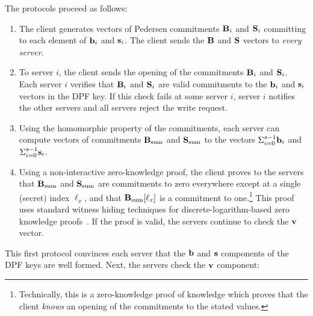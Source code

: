 \documentclass[10pt,twocolumn]{article}
\begin{document}
The protocols proceed as follows:

\begin{enumerate}
  \item The client generates vectors of Pedersen commitments ${\bf B}_i$
    and ${\bf S}_i$ committing to each element of ${\bf b}_i$ and ${\bf s}_i$.
    The client sends the ${\bf B}$ and ${\bf S}$ vectors to {\em every server}.
  \item To server $i$, the client sends the opening of the commitments
    ${\bf B}_i$ and ${\bf S}_i$.
    Each server $i$ verifies that ${\bf B}_i$ and ${\bf S}_i$ are valid
    commitments to the ${\bf b}_i$ and ${\bf s}_i$ vectors in the DPF key.
    If this check fails at some server $i$, server $i$
    notifies the other servers and all servers reject the write request.
  \item \label{item:check-commit}
    Using the homomorphic property of the commitments, each server can compute
    vectors of commitments ${\bf B}_\textrm{sum}$ and ${\bf S}_\textrm{sum}$
    to the vectors $\Sigma_{i=0}^{s-1} {\bf b}_i$ and $\Sigma_{i=0}^{s-1} {\bf s}_i$.
  \item \label{item:check-proof}
    Using a non-interactive zero-knowledge proof, the client proves to 
    the servers that ${\bf B}_\textrm{sum}$ and ${\bf S}_\textrm{sum}$
    are commitments to zero everywhere except at a single (secret) index $\ell_x$,
    and that ${\bf B}_\textrm{sum}[\ell_x]$ is a commitment to one.\footnote{
Technically, this is a zero-knowledge proof of knowledge
which proves that the client {\em knows} an opening of
the commitments to the stated values.
}
    This proof uses standard witness hiding techniques
    for discrete-logarithm-based zero knowledge 
    proofs~\cite{camenisch1997proof,cramer1994proofs}.
    If the proof is valid, the servers continue to check the ${\bf v}$ vector.
\end{enumerate}

This first protocol convinces each server that the ${\bf b}$ and ${\bf s}$ components
of the DPF keys are well formed.
Next, the servers check the ${\bf v}$ component:
\end{document}
